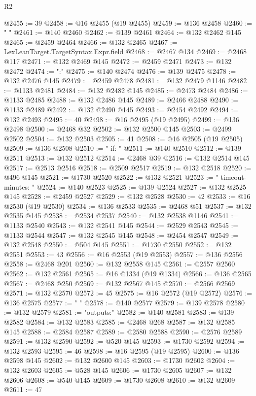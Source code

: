 \begin{lexlean}{R2}
\begin{coremodule}
@2455 := 39
@2458 := @16 @2455 (@19 @2455)
@2459 := @136 @2458
@2460 := "  "
@2461 := @140 @2460
@2462 := @139 @2461
@2464 := @132 @2462 @145
@2465 := @2459 @2464
@2466 := @132 @2465
@2467 := LexLeanTarget.TargetSyntax.Expr.field
@2468 := @2467 @134
@2469 := @2468 @117
@2471 := @132 @2469 @145
@2472 := @2459 @2471
@2473 := @132 @2472
@2474 := ":"
@2475 := @140 @2474
@2476 := @139 @2475
@2478 := @132 @2476 @145
@2479 := @2459 @2478
@2481 := @132 @2479 @1146
@2482 := @1133 @2481
@2484 := @132 @2482 @145
@2485 := @2473 @2484
@2486 := @1133 @2485
@2488 := @132 @2486 @145
@2489 := @2466 @2488
@2490 := @1133 @2489
@2492 := @132 @2490 @145
@2493 := @2454 @2492
@2494 := @132 @2493
@2495 := 40
@2498 := @16 @2495 (@19 @2495)
@2499 := @136 @2498
@2500 := @2468 @32
@2502 := @132 @2500 @145
@2503 := @2499 @2502
@2504 := @132 @2503
@2505 := 41
@2508 := @16 @2505 (@19 @2505)
@2509 := @136 @2508
@2510 := "    if: "
@2511 := @140 @2510
@2512 := @139 @2511
@2513 := @132 @2512
@2514 := @2468 @39
@2516 := @132 @2514 @145
@2517 := @2513 @2516
@2518 := @2509 @2517
@2519 := @132 @2518
@2520 := @496 @145
@2521 := @1730 @2520
@2522 := @132 @2521
@2523 := "    timeout-minutes: "
@2524 := @140 @2523
@2525 := @139 @2524
@2527 := @132 @2525 @145
@2528 := @2459 @2527
@2529 := @132 @2528
@2530 := 42
@2533 := @16 @2530 (@19 @2530)
@2534 := @136 @2533
@2535 := @2468 @51
@2537 := @132 @2535 @145
@2538 := @2534 @2537
@2540 := @132 @2538 @1146
@2541 := @1133 @2540
@2543 := @132 @2541 @145
@2544 := @2529 @2543
@2545 := @1133 @2544
@2547 := @132 @2545 @145
@2548 := @2454 @2547
@2549 := @132 @2548
@2550 := @504 @145
@2551 := @1730 @2550
@2552 := @132 @2551
@2553 := 43
@2556 := @16 @2553 (@19 @2553)
@2557 := @136 @2556
@2558 := @2468 @201
@2560 := @132 @2558 @145
@2561 := @2557 @2560
@2562 := @132 @2561
@2565 := @16 @1334 (@19 @1334)
@2566 := @136 @2565
@2567 := @2468 @250
@2569 := @132 @2567 @145
@2570 := @2566 @2569
@2571 := @132 @2570
@2572 := 45
@2575 := @16 @2572 (@19 @2572)
@2576 := @136 @2575
@2577 := "    "
@2578 := @140 @2577
@2579 := @139 @2578
@2580 := @132 @2579
@2581 := "outputs:"
@2582 := @140 @2581
@2583 := @139 @2582
@2584 := @132 @2583
@2585 := @2468 @268
@2587 := @132 @2585 @145
@2588 := @2584 @2587
@2589 := @2580 @2588
@2590 := @2576 @2589
@2591 := @132 @2590
@2592 := @520 @145
@2593 := @1730 @2592
@2594 := @132 @2593
@2595 := 46
@2598 := @16 @2595 (@19 @2595)
@2600 := @136 @2598 @145
@2602 := @132 @2600 @145
@2603 := @1730 @2602
@2604 := @132 @2603
@2605 := @528 @145
@2606 := @1730 @2605
@2607 := @132 @2606
@2608 := @540 @145
@2609 := @1730 @2608
@2610 := @132 @2609
@2611 := 47

\end{coremodule}
\end{lexlean}
